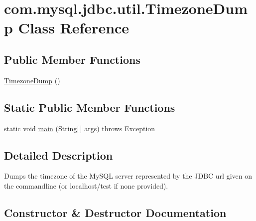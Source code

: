 \hypertarget{classcom_1_1mysql_1_1jdbc_1_1util_1_1_timezone_dump}{}\section{com.\+mysql.\+jdbc.\+util.\+Timezone\+Dump Class Reference}
\label{classcom_1_1mysql_1_1jdbc_1_1util_1_1_timezone_dump}
\subsection*{Public Member Functions}
\begin{DoxyCompactItemize}
\item 
\mbox{\hyperlink{classcom_1_1mysql_1_1jdbc_1_1util_1_1_timezone_dump_afe8cb341580cf3a2902924705d5f82b6}{Timezone\+Dump}} ()
\end{DoxyCompactItemize}
\subsection*{Static Public Member Functions}
\begin{DoxyCompactItemize}
\item 
static void \mbox{\hyperlink{classcom_1_1mysql_1_1jdbc_1_1util_1_1_timezone_dump_a621749317f16279559fa29fd9bb55fd7}{main}} (String\mbox{[}$\,$\mbox{]} args)  throws Exception 
\end{DoxyCompactItemize}


\subsection{Detailed Description}
Dumps the timezone of the My\+S\+QL server represented by the J\+D\+BC url given on the commandline (or localhost/test if none provided). 

\subsection{Constructor \& Destructor Documentation}
\mbox{\label{classcom_1_1mysql_1_1jdbc_1_1util_1_1_timezone_dump_afe8cb341580cf3a2902924705d5f82b6}} 
